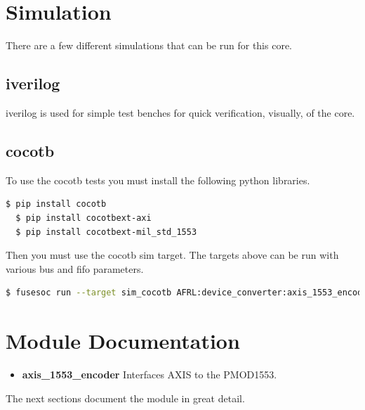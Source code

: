 \newpage

\section{Simulation}
\par
There are a few different simulations that can be run for this core.

\subsection{iverilog}
\par
iverilog is used for simple test benches for quick verification, visually, of the core.

\subsection{cocotb}
\par
To use the cocotb tests you must install the following python libraries.
\begin{lstlisting}[language=bash]
  $ pip install cocotb
  $ pip install cocotbext-axi
  $ pip install cocotbext-mil_std_1553
\end{lstlisting}

Then you must use the cocotb sim target. The targets above can be run with various bus and fifo parameters.

\begin{lstlisting}[language=bash]
  $ fusesoc run --target sim_cocotb AFRL:device_converter:axis_1553_encoder:1.0.0
\end{lstlisting}


\newpage

\section{Module Documentation} \label{Module Documentation}

\begin{itemize}
\item \textbf{axis\_1553\_encoder} Interfaces AXIS to the PMOD1553.\\
\end{itemize}
The next sections document the module in great detail.

